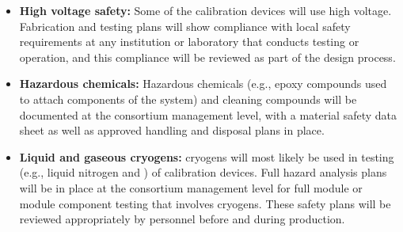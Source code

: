 \begin{itemize}

\item {\bf High voltage safety:} Some of the calibration devices will use high voltage. Fabrication and testing plans will show compliance with local  safety requirements at any institution or laboratory that conducts testing or operation, and this compliance will be reviewed as part of the design process.

\item {\bf Hazardous chemicals:} Hazardous chemicals (e.g., epoxy compounds used to attach components of the system) and cleaning compounds will be documented at the consortium management level, with a material safety data sheet as well as approved handling and disposal plans in place.

\item {\bf Liquid and gaseous cryogens:} cryogens will most likely be used in testing (e.g., liquid nitrogen and ) of calibration devices. Full hazard analysis plans will be in place at the consortium management level for full module or module component testing that involves cryogens. These safety plans will be reviewed appropriately by   personnel before and during production.

\end{itemize}



